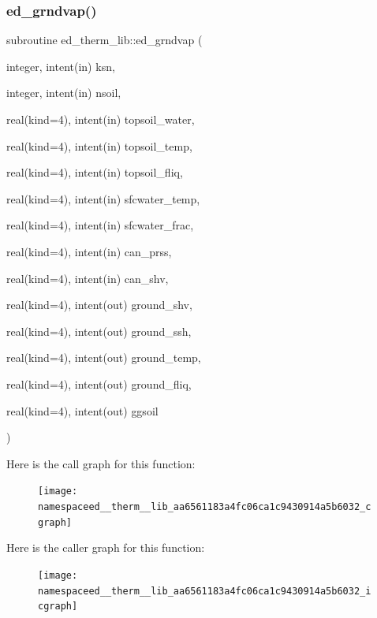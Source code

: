 \subsubsection{\texorpdfstring{ed\+\_\+grndvap()}{ed\_grndvap()}}
{\footnotesize\ttfamily subroutine ed\+\_\+therm\+\_\+lib\+::ed\+\_\+grndvap (\begin{DoxyParamCaption}\item[{integer, intent(in)}]{ksn,  }\item[{integer, intent(in)}]{nsoil,  }\item[{real(kind=4), intent(in)}]{topsoil\+\_\+water,  }\item[{real(kind=4), intent(in)}]{topsoil\+\_\+temp,  }\item[{real(kind=4), intent(in)}]{topsoil\+\_\+fliq,  }\item[{real(kind=4), intent(in)}]{sfcwater\+\_\+temp,  }\item[{real(kind=4), intent(in)}]{sfcwater\+\_\+frac,  }\item[{real(kind=4), intent(in)}]{can\+\_\+prss,  }\item[{real(kind=4), intent(in)}]{can\+\_\+shv,  }\item[{real(kind=4), intent(out)}]{ground\+\_\+shv,  }\item[{real(kind=4), intent(out)}]{ground\+\_\+ssh,  }\item[{real(kind=4), intent(out)}]{ground\+\_\+temp,  }\item[{real(kind=4), intent(out)}]{ground\+\_\+fliq,  }\item[{real(kind=4), intent(out)}]{ggsoil }\end{DoxyParamCaption})}

Here is the call graph for this function\+:
\nopagebreak
\begin{figure}[H]
\begin{center}
\leavevmode
\texttt{[image: namespaceed\_\_therm\_\_lib\_aa6561183a4fc06ca1c9430914a5b6032\_cgraph]}
\end{center}
\end{figure}
Here is the caller graph for this function\+:
\nopagebreak
\begin{figure}[H]
\begin{center}
\leavevmode
\texttt{[image: namespaceed\_\_therm\_\_lib\_aa6561183a4fc06ca1c9430914a5b6032\_icgraph]}
\end{center}
\end{figure}
\mbox{\label{namespaceed__therm__lib_a746a2bb61d932fd3cb928a3b5e5e832e}} 
